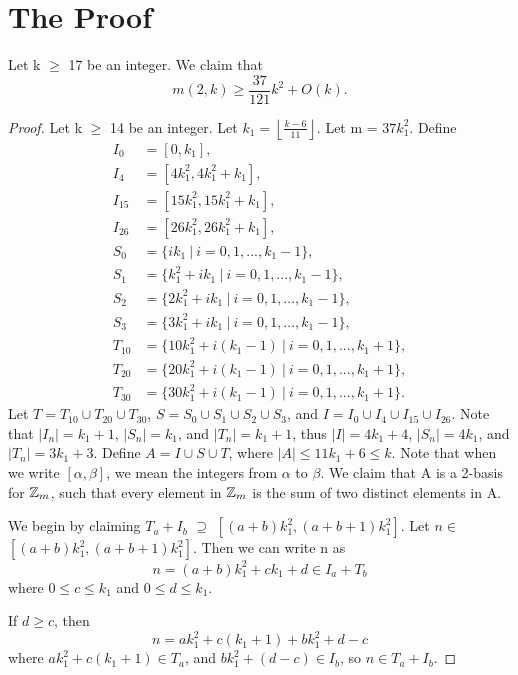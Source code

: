\section{ The Proof}
\begin{theorem}
Let k $\geq$ 17 be an integer. We claim that
 \[
m(2,k) \geq \frac{37}{121}k^2 + O(k). 
\]
\end{theorem}
\begin{proof}
Let k $\geq$ 14 be an integer. Let $k_1 = \left \lfloor \frac{k - 6}{11} \right \rfloor$. Let m = $37k_1^2$.  Define 
\begin{align*}
I_0 &= [0, k_1], \\
I_4 &= [4k_1^2, 4k_1^2+k_1], \\
I_{15} &= [15k_1^2, 15k_1^2+k_1],\\
I_{26} &= [26k_1^2, 26k_1^2+k_1], \\
S_0 &= \{ik_1 \ |\  i = 0 , 1, ... , k_1 - 1\},\\
S_1 &= \{k_1^2 + ik_1 \ |\  i = 0 , 1, ... , k_1 - 1\},\\
S_2 &= \{2k_1^2 + ik_1 \ |\  i = 0 , 1, ... , k_1 - 1\}, \\
S_3 &= \{3k_1^2 +ik_1 \ |\   i = 0 , 1, ... , k_1 - 1\}, \\
T_{10} &= \{10k_1^2+ i(k_1 - 1) \ |\   i = 0 , 1, ... , k_1 + 1\},\\
T_{20} &= \{20k_1^2 + i(k_1 - 1) \ |\  i = 0 , 1, ... , k_1 + 1\}, \\
T_{30} &= \{30k_1^2 + i(k_1 - 1) \ |\  i = 0 , 1, ... , k_1 + 1\}.
\end{align*}
Let $T = T_{10} \cup T_{20} \cup T_{30}$, $S = S_{0} \cup S_{1} \cup S_{2} \cup S_{3}$, and $I = I_{0} \cup I_{4} \cup I_{15} \cup I_{26}.$ Note that $|I_n| = k_1 + 1$, $|S_n| = k_1$, and $|T_n| = k_1 + 1$, thus $|I| = 4k_1 + 4$, $|S_n| = 4k_1$, and $|T_n| = 3k_1 + 3$. Define $A = I \cup S \cup T$, where $|A| \leq 11k_1 + 6 \leq k$. Note that when we write $[\alpha, \beta]$, we mean the integers from $\alpha$ to $\beta$. We claim that A is a 2-basis for $\mbox{$\mathbb Z$}_m$, such that every element in $\mbox{$\mathbb Z$}_m$ is the sum of two distinct elements in A.

We begin by claiming $T_a + I_b$ $\supseteq$ $[(a + b)k_1^2 ,  (a + b + 1)k_1^2]$. Let $n \in$ $[(a + b)k_1^2 ,  (a + b + 1)k_1^2]$.
Then we can write n as 
\[
n = (a + b) k_1^2 + ck_1 + d \in I_a + T_b 
\]
where $0 \leq c \leq k_1$ and $0 \leq d \leq k_1$.

If $d \geq c$, then
\[
n = ak_1^2 + c(k_1 + 1) + bk_1^2 + d -  c 
\]
where $ak_1^2 +c(k_1 + 1) \in T_a$, and $bk_1^2 + (d - c) \in I_b$, so $n \in T_a + I_b$. 


\end{proof}
